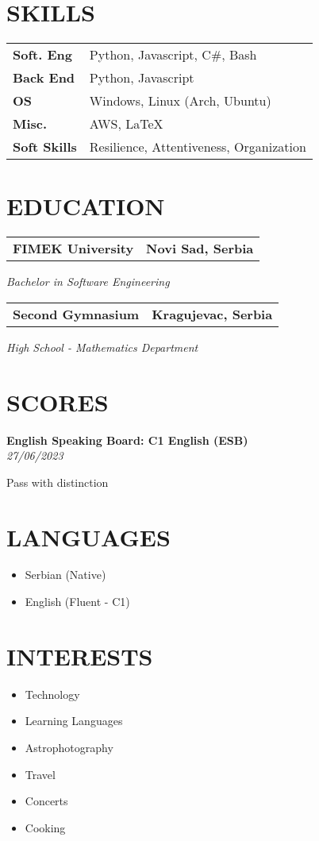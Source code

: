 \documentclass[11pt,a4paper]{moderncv}
\newcommand*{\educationentry}[4][0.5mm]{
    \begin{tabularx}{\textwidth}{LR}
        {\bfseries #3} & {\bfseries #4} \\
    \end{tabularx}
    {\itshape #2}
    \par\addvspace{#1}
}
\newcommand*{\scoreentry}[3][2.5mm]{
    {\bfseries #2} \\
    {\itshape #3}
    \par\addvspace{#1}
}
\begin{document}
\begin{minipage}[t]{0.35\textwidth}
    \section{SKILLS}
    \begin{tabularx}{\textwidth}{>{\bfseries}l@{\hskip 3.5mm}L}
        Soft. Eng   & Python, Javascript, C\#, Bash           \\
        Back End    & Python, Javascript                      \\
        OS          & Windows, Linux (Arch, Ubuntu)           \\
        Misc.       & AWS, \LaTeX                             \\
        Soft Skills & Resilience, Attentiveness, Organization
    \end{tabularx}

    \section{EDUCATION}
    \educationentry{Bachelor in Software Engineering}{FIMEK University}{Novi Sad, Serbia}
    \par
    \vspace{3.0mm}
    \educationentry{High School - Mathematics Department}{Second Gymnasium}{Kragujevac, Serbia}

    \section{SCORES}
    \scoreentry{English Speaking Board: C1 English (ESB)}{27/06/2023}
    Pass with distinction


    \section{LANGUAGES}
    \begin{itemize}
        \item Serbian (Native)
        \item English (Fluent - C1)
    \end{itemize}

    \section{INTERESTS}
    \begin{itemize}
        \item Technology
        \item Learning Languages
        \item Astrophotography
        \item Travel
        \item Concerts
        \item Cooking
    \end{itemize}
\end{minipage}
\end{document}
